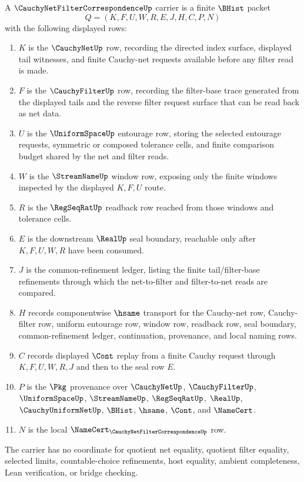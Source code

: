 \begin{definition}
\label{def:cauchy-net-filter-correspondence-carrier}
A $\CauchyNetFilterCorrespondenceUp$ carrier is a finite $\BHist$ packet
$$
Q=(K,F,U,W,R,E,J,H,C,P,N)
$$
with the following displayed rows:
\begin{enumerate}
\item $K$ is the $\CauchyNetUp$ row, recording the directed index surface, displayed tail witnesses, and finite Cauchy-net requests available before any filter read is made.
\item $F$ is the $\CauchyFilterUp$ row, recording the filter-base trace generated from the displayed tails and the reverse filter request surface that can be read back as net data.
\item $U$ is the $\UniformSpaceUp$ entourage row, storing the selected entourage requests, symmetric or composed tolerance cells, and finite comparison budget shared by the net and filter reads.
\item $W$ is the $\StreamNameUp$ window row, exposing only the finite windows inspected by the displayed $K,F,U$ route.
\item $R$ is the $\RegSeqRatUp$ readback row reached from those windows and tolerance cells.
\item $E$ is the downstream $\RealUp$ seal boundary, reachable only after $K,F,U,W,R$ have been consumed.
\item $J$ is the common-refinement ledger, listing the finite tail/filter-base refinements through which the net-to-filter and filter-to-net reads are compared.
\item $H$ records componentwise $\hsame$ transport for the Cauchy-net row, Cauchy-filter row, uniform entourage row, window row, readback row, seal boundary, common-refinement ledger, continuation, provenance, and local naming rows.
\item $C$ records displayed $\Cont$ replay from a finite Cauchy request through $K,F,U,W,R,J$ and then to the seal row $E$.
\item $P$ is the $\Pkg$ provenance over $\CauchyNetUp$, $\CauchyFilterUp$, $\UniformSpaceUp$, $\StreamNameUp$, $\RegSeqRatUp$, $\RealUp$, $\CauchyUniformNetUp$, $\BHist$, $\hsame$, $\Cont$, and $\NameCert$.
\item $N$ is the local $\NameCert_{\CauchyNetFilterCorrespondenceUp}$ row.
\end{enumerate}
The carrier has no coordinate for quotient net equality, quotient filter equality, selected limits, countable-choice refinements, host equality, ambient completeness, Lean verification, or bridge checking.
\end{definition}

